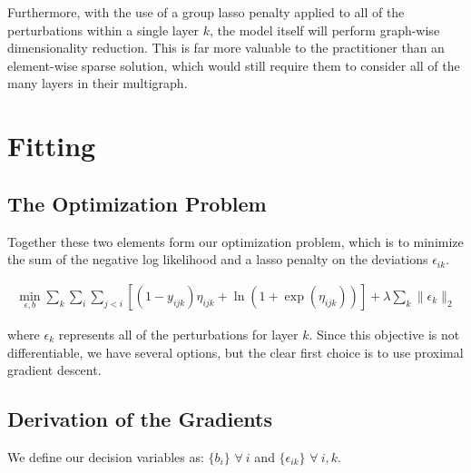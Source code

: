\documentclass{article}
\begin{document}
Furthermore, with the use of a group lasso penalty applied to all of the perturbations within a single layer $k$, the model itself will perform graph-wise dimensionality reduction. This is far more valuable to the practitioner than an element-wise sparse solution, which would still require them to consider all of the many layers in their multigraph. %




\section{Fitting}
\subsection{The Optimization Problem}

Together these two elements form our optimization problem, which is to minimize the sum of the negative log likelihood and a lasso penalty on the deviations $\epsilon_{ik}$.

\begin{align*}
\min_{\epsilon, b} \sum_k \sum_{i} \sum_{j < i} [ (1 - y_{ijk})\eta_{ijk} +  \ln (1+\exp(\eta_{ijk})) ] + \lambda \sum_k \| \epsilon_{k}\|_2
\end{align*}

where $\epsilon_k$ represents all of the perturbations for layer $k$. Since this objective is not differentiable, we have several options, but the clear first choice is to use proximal gradient descent. %

\subsection{Derivation of the Gradients}

We define our decision variables as: $\{b_i\}$ $\forall~i$ and $\{\epsilon_{ik}\}$ $\forall~i,k$.
\end{document}
